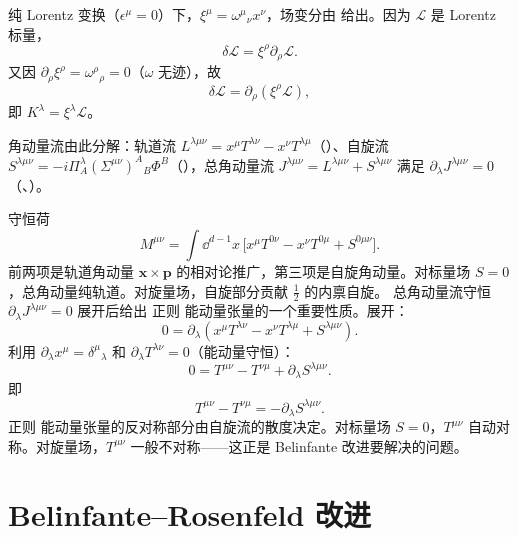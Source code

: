 纯 Lorentz 变换（$\epsilon^\mu=0$）下，$\xi^\mu=\omega^\mu{}_\nu x^\nu$，场变分由 给出。因为 $\mathcal{L}$ 是 Lorentz 标量，
\begin{equation*}
\delta\mathcal{L}=\xi^\rho\partial_\rho\mathcal{L}.
\end{equation*}
又因 $\partial_\rho\xi^\rho=\omega^\rho{}_\rho=0$（$\omega$ 无迹），故
\begin{equation*}
\delta\mathcal{L}=\partial_\rho(\xi^\rho\mathcal{L}),
\end{equation*}
即 $K^\lambda=\xi^\lambda\mathcal{L}$。

角动量流由此分解：轨道流 $L^{\lambda\mu\nu}=x^\mu T^{\lambda\nu}-x^\nu T^{\lambda\mu}$（）、自旋流 $S^{\lambda\mu\nu}=-i\Pi_A^\lambda(\Sigma^{\mu\nu})^A{}_B\Phi^B$（），总角动量流 $J^{\lambda\mu\nu}=L^{\lambda\mu\nu}+S^{\lambda\mu\nu}$ 满足 $\partial_\lambda J^{\lambda\mu\nu}=0$（、）。

守恒荷
\begin{equation*}\boxed{
M^{\mu\nu}=\int \dd^{d-1}x\,\big[x^\mu T^{0\nu}-x^\nu T^{0\mu}+S^{0\mu\nu}\big].
}
\end{equation*}
前两项是轨道角动量 $\mathbf{x}\times\mathbf{p}$ 的相对论推广，第三项是自旋角动量。对标量场 $S=0$，总角动量纯轨道。对旋量场，自旋部分贡献 $\frac{1}{2}$ 的内禀自旋。
总角动量流守恒 $\partial_\lambda J^{\lambda\mu\nu}=0$ 展开后给出 正则 能动量张量的一个重要性质。展开：
\begin{equation*}
0=\partial_\lambda(x^\mu T^{\lambda\nu}-x^\nu T^{\lambda\mu}+S^{\lambda\mu\nu}).
\end{equation*}
利用 $\partial_\lambda x^\mu=\delta^\mu{}_\lambda$ 和 $\partial_\lambda T^{\lambda\nu}=0$（能动量守恒）：
\begin{equation*}
0=T^{\mu\nu}-T^{\nu\mu}+\partial_\lambda S^{\lambda\mu\nu}.
\end{equation*}
即
\begin{equation}\label{eq:ms-poincare-T-asym}
\boxed{
T^{\mu\nu}-T^{\nu\mu}=-\partial_\lambda S^{\lambda\mu\nu}.
}
\end{equation}
正则 能动量张量的反对称部分由自旋流的散度决定。对标量场 $S=0$，$T^{\mu\nu}$ 自动对称。对旋量场，$T^{\mu\nu}$ 一般不对称——这正是 Belinfante 改进要解决的问题。

\section{Belinfante--Rosenfeld 改进}

